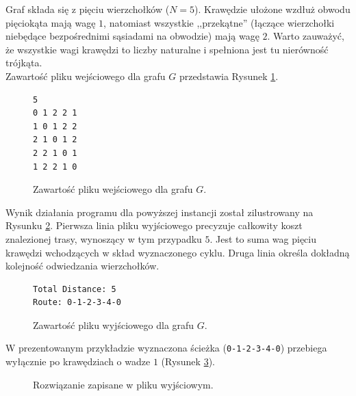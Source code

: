 \documentclass{article}
\theoremstyle{definition}
\theoremstyle{plain}
\theoremstyle{remark}
\begin{document}
\noindent
Graf składa się z pięciu wierzchołków ($N=5$). Krawędzie ułożone wzdłuż obwodu pięciokąta mają wagę $1$, natomiast wszystkie ,,przekątne'' (łączące wierzchołki niebędące bezpośrednimi sąsiadami na obwodzie) mają wagę $2$. Warto zauważyć, że wszystkie wagi krawędzi to liczby naturalne i spełniona jest tu nierówność trójkąta. \\

\noindent
Zawartość pliku wejściowego dla grafu $G$ przedstawia Rysunek \ref{lst:input}.

\begin{figure}[H]
\begin{verbatim}
5
0 1 2 2 1
1 0 1 2 2
2 1 0 1 2
2 2 1 0 1
1 2 2 1 0
\end{verbatim}
\caption{Zawartość pliku wejściowego dla grafu $G$.}
\label{lst:input}
\end{figure}

\newpage
\noindent
Wynik działania programu dla powyższej instancji został zilustrowany na Rysunku \ref{lst:output}. Pierwsza linia pliku wyjściowego precyzuje całkowity koszt znalezionej trasy, wynoszący w tym przypadku $5$. Jest to suma wag pięciu krawędzi wchodzących w skład wyznaczonego cyklu. Druga linia określa dokładną kolejność odwiedzania wierzchołków. 

\begin{figure}[H]
\begin{verbatim}
Total Distance: 5
Route: 0-1-2-3-4-0
\end{verbatim}
\caption{Zawartość pliku wyjściowego dla grafu $G$.}
\label{lst:output}
\end{figure}

\noindent
W prezentowanym przykładzie wyznaczona ścieżka (\texttt{0-1-2-3-4-0}) przebiega wyłącznie po krawędziach o wadze $1$ (Rysunek \ref{rys:optymalny}).

\begin{figure}[H]
    \centering
    \caption{Rozwiązanie zapisane w pliku wyjściowym.}
    \label{rys:optymalny}
\end{figure}
\end{document}
